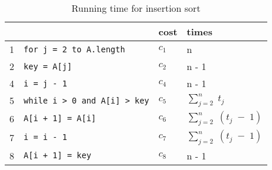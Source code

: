 \begin{center}
	\begin{table}[h]
		\centering
		\begin{tabular}{|l|l|l|l|}
			 \hline
			  &  													& \textbf{cost}	& \textbf{times}					\\ \hline
			1 & \lstinline|for j = 2 to A.length| 					& $c_1$ 		& n 								\\
			2 & \quad\quad \lstinline|key = A[j]| 					& $c_2$ 		& n - 1 							\\
			4 & \quad\quad \lstinline|i = j - 1| 					& $c_4$ 		& n - 1 							\\
			5 & \quad\quad \lstinline|while i > 0 and A[i] > key|	& $c_5$ 		&  $\sum_{j=2}^{n}\;t_j$ 			\\
			6 & \quad\quad\quad\quad \lstinline|A[i + 1] = A[i]|	& $c_6$ 		&  $\sum_{j=2}^{n}\;(t_j\;-\;1)$ 	\\
			7 & \quad\quad\quad\quad \lstinline|i = i - 1| 			& $c_7$ 		&  $\sum_{j=2}^{n}\;(t_j\;-\;1)$ 	\\
			8 & \quad\quad \lstinline|A[i + 1] = key| 			& $c_8$ 		&  n - 1 	\\ \hline
		\end{tabular}
		\caption{Running time for insertion sort}
		\label{tab:insertionCode}
	\end{table}
\end{center}